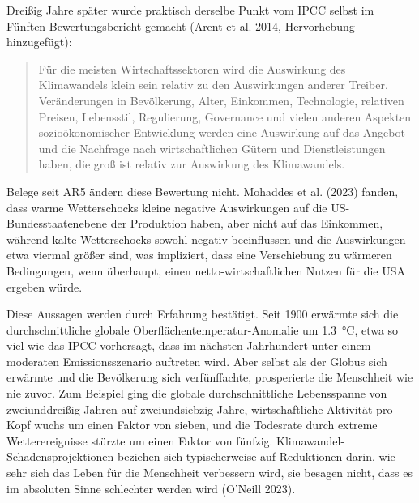 \documentclass[12pt,paper=a4,DIV=12,parskip=never,chapterprefix=false,headings=standardclasses]{scrreprt}
\begin{document}
Dreißig Jahre später wurde praktisch derselbe Punkt vom IPCC selbst im Fünften Bewertungsbericht gemacht (Arent et al. 2014, Hervorhebung hinzugefügt):

\begin{quote}
Für die meisten Wirtschaftssektoren wird die Auswirkung des Klimawandels klein sein relativ zu den Auswirkungen anderer Treiber. Veränderungen in Bevölkerung, Alter, Einkommen, Technologie, relativen Preisen, Lebensstil, Regulierung, Governance und vielen anderen Aspekten sozioökonomischer Entwicklung werden eine Auswirkung auf das Angebot und die Nachfrage nach wirtschaftlichen Gütern und Dienstleistungen haben, die groß ist relativ zur Auswirkung des Klimawandels.
\end{quote}

Belege seit AR5 ändern diese Bewertung nicht. Mohaddes et al. (2023) fanden, dass warme Wetterschocks kleine negative Auswirkungen auf die US-Bundesstaatenebene der Produktion haben, aber nicht auf das Einkommen, während kalte Wetterschocks sowohl negativ beeinflussen und die Auswirkungen etwa viermal größer sind, was impliziert, dass eine Verschiebung zu wärmeren Bedingungen, wenn überhaupt, einen netto-wirtschaftlichen Nutzen für die USA ergeben würde.

Diese Aussagen werden durch Erfahrung bestätigt. Seit 1900 erwärmte sich die durchschnittliche globale Oberflächentemperatur-Anomalie um \SI{1.3}{\celsius}, etwa so viel wie das IPCC vorhersagt, dass im nächsten Jahrhundert unter einem moderaten Emissionsszenario auftreten wird. Aber selbst als der Globus sich erwärmte und die Bevölkerung sich verfünffachte, prosperierte die Menschheit wie nie zuvor. Zum Beispiel ging die globale durchschnittliche Lebensspanne von zweiunddreißig Jahren auf zweiundsiebzig Jahre, wirtschaftliche Aktivität pro Kopf wuchs um einen Faktor von sieben, und die Todesrate durch extreme Wetterereignisse stürzte um einen Faktor von fünfzig. Klimawandel-Schadensprojektionen beziehen sich typischerweise auf Reduktionen darin, wie sehr sich das Leben für die Menschheit verbessern wird, sie besagen nicht, dass es im absoluten Sinne schlechter werden wird (O'Neill 2023).
\end{document}
